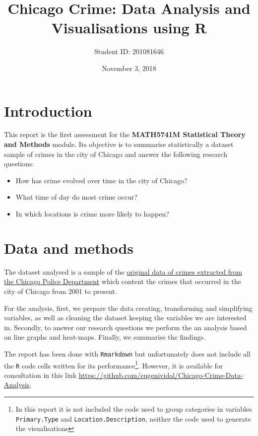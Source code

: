 \documentclass[]{article}
\title{Chicago Crime: Data Analysis and Visualisations using R}
\author{Student ID: 201081646}
\date{November 3, 2018}
\let\rmarkdownfootnote\footnote%
\def\footnote{\protect\rmarkdownfootnote}
\begin{document}
\maketitle

\section{Introduction}\label{introduction}

This report is the first assessment for the \textbf{MATH5741M
Statistical Theory and Methods} module. Its objective is to summarise
statistically a dataset sample of crimes in the city of Chicago and
answer the following research questions:

\begin{itemize}
\item
  How has crime evolved over time in the city of Chicago?
\item
  What time of day do most crime occur?
\item
  In which locations is crime more likely to happen?
\end{itemize}

\section{Data and methods}\label{data-and-methods}

The dataset analysed is a sample of the
\href{https://data.cityofchicago.org/Public-Safety/Crimes-2001-to-present/ijzp-q8t2}{original
data of crimes extracted from the Chicago Police Department} which
content the crimes that occurred in the city of Chicago from 2001 to
present.

For the analysis, first, we prepare the data creating, transforming and
simplifying variables, as well as cleaning the dataset keeping the
variables we are interested in. Secondly, to answer our research
questions we perform the an analysis based on line graphs and heat-maps.
Finally, we summarise the findings.

The report has been done with \texttt{Rmarkdown} but unfortunately does
not include all the \texttt{R} code cells written for its
performance\footnote{In this report it is not included the code used to
  group categories in variables \texttt{Primary.Type} and
  \texttt{Location.Description}, neither the code used to generate the
  visualisations}. However, it is available for consultation in this
link \url{https://github.com/eugenividal/Chicago-Crime-Data-Analysis}.
\end{document}
